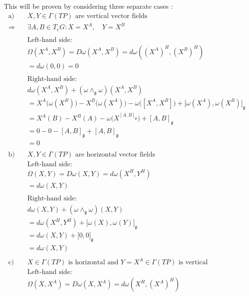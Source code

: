 This will be proven by considering three separate cases \cite{FredericSchullerCurvaturetorsionprincipalbundlesLec24FredericSchuller2015}:
\begin{align*}
  \text{a)} \quad & X, Y \in \Gamma(TP) \text{ are vertical vector fields} \\
  \Rightarrow\quad & \exists A, B \in T_eG : X = X^A, \quad Y = X^B \\
  \\
  & \text{Left-hand side:} \\
  & \Omega(X^A, X^B) = D\omega(X^A, X^B) = d\omega\left( (X^A)^H, (X^B)^H \right) \\
  &= d\omega(0, 0) = 0 \\
  \\
  & \text{Right-hand side:} \\
  & d\omega(X^A, X^B) + (\omega \wedge_{\mathfrak{g}} \omega)(X^A, X^B) \\
  &= X^A \big( \omega(X^B) \big) - X^B \big( \omega(X^A) \big) - \omega\big( [X^A, X^B] \big) + \big[ \omega(X^A), \omega(X^B) \big]_{\mathfrak{g}} \\
  &= X^A (B) - X^B (A) - \omega\big( X^{[A,B]_\mathfrak{g}} \big) + [A,B]_{\mathfrak{g}} \\
  &= 0 - 0 - [A,B]_{\mathfrak{g}} + [A,B]_{\mathfrak{g}} \\
  &= 0 \\
  \\ 
  \text{b)} \quad & X, Y \in \Gamma(TP) \text{ are horizontal vector fields} \\
    & \text{Left-hand side:} \\
  & \Omega(X,Y) = D\omega(X,Y) = d\omega(X^H, Y^H) \\
  &= d\omega(X, Y) \\
  \\
  &\text{Right-hand side:} \\
  & d\omega(X,Y) + (\omega \wedge_{\mathfrak{g}} \omega)(X,Y) \\
  &= d\omega(X^H, Y^H) + \big[ \omega(X), \omega(Y) \big]_\mathfrak{g} \\
  &= d\omega(X,Y) + \big[ 0, 0 \big]_\mathfrak{g} \\
  &= d\omega(X,Y) \\
  \\
  \text{c)} \quad & X \in \Gamma(TP) \text{ is horizontal and } Y=X^A \in \Gamma(TP) \text{ is vertical} \\
      & \text{Left-hand side:} \\
  &\Omega(X,X^A) = D\omega(X,X^A) = d\omega(X^H, (X^A)^H) \\

\end{align*}
